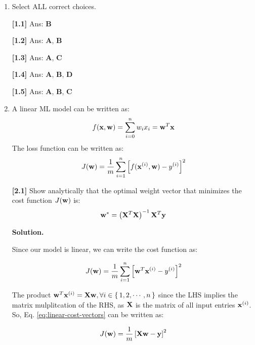 \documentclass[11pt]{article}
\begin{document}

\begin{enumerate}[start=1,label={\bfseries Question \arabic*:},leftmargin=1in] %

    \item Select ALL correct choices.
    
    \textbf{[1.1]} Ans: \textbf{B}

    \textbf{[1.2]} Ans: \textbf{A}, \textbf{B}
    
    \textbf{[1.3]} Ans: \textbf{A}, \textbf{C}
    
    \textbf{[1.4]} Ans: \textbf{A}, \textbf{B}, \textbf{D}
    
    \textbf{[1.5]} Ans: \textbf{A}, \textbf{B}, \textbf{C}


    \item A linear ML model can be written as: \[f(\vb{x}, \vb{w}) = \sum_{i=0}^n w_i x_i = \vb{w}^T \vb{x}\] The loss function can be written as: \[ J(\vb{w}) = \frac{1}{m} \sum_{i=1}^n \left[ f(\vb{x}^{(i)}, \vb{w}) - y^{(i)} \right]^2 \]

        \textbf{[2.1]} Show analytically that the optimal weight vector that minimizes the cost function \(J(\vb{w})\) is: \[\vb{w}^* = \left( \vb{X}^T\vb{X}  \right)^{-1} \vb{X}^T\vb{y} \]

        \noindent \textbf{Solution.}

        \noindent Since our model is linear, we can write the cost function as:

        \begin{equation}
            J(\vb{w}) = \frac{1}{m} \sum_{i=1}^n \left[ \vb{w}^T \vb{x}^{(i)} - y^{(i)} \right]^2
            \label{eq:linear-cost-vectors}
        \end{equation}

        The product \(\vb{w}^T \vb{x}^{(i)} = \vb{Xw}, \forall i \in \set{1, 2, \cdots, n}\) since the LHS implies the matrix mulplitcation of the RHS, as \(\vb{X}\) is the matrix of all input entries \(\vb{x}^{(i)}\). So, Eq. \ref{eq:linear-cost-vectors} can be written as:

        \begin{equation}
            J(\vb{w}) = \frac{1}{m} \left[ \vb{Xw}  - \vb{y} \right]^2
            \label{eq:linear-cost-sum-matrix}
        \end{equation}


\end{enumerate}
\end{document}

